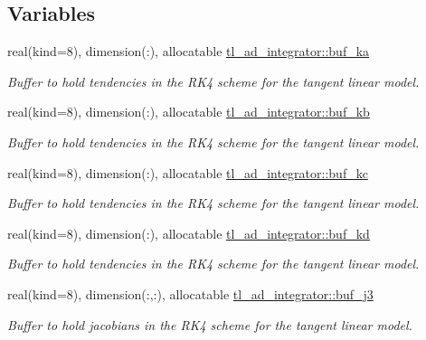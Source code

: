 \subsection*{Variables}
\begin{DoxyCompactItemize}
\item 
real(kind=8), dimension(\+:), allocatable \hyperlink{namespacetl__ad__integrator_a879cc86c1e268775237b6776a4ff7d32}{tl\+\_\+ad\+\_\+integrator\+::buf\+\_\+ka}
\begin{DoxyCompactList}\small\item\em Buffer to hold tendencies in the R\+K4 scheme for the tangent linear model. \end{DoxyCompactList}\item 
real(kind=8), dimension(\+:), allocatable \hyperlink{namespacetl__ad__integrator_abd6a1c209bc0120ea4e1e473e067a902}{tl\+\_\+ad\+\_\+integrator\+::buf\+\_\+kb}
\begin{DoxyCompactList}\small\item\em Buffer to hold tendencies in the R\+K4 scheme for the tangent linear model. \end{DoxyCompactList}\item 
real(kind=8), dimension(\+:), allocatable \hyperlink{namespacetl__ad__integrator_a1cf59efa7229b47e580202dfe4bd4fd6}{tl\+\_\+ad\+\_\+integrator\+::buf\+\_\+kc}
\begin{DoxyCompactList}\small\item\em Buffer to hold tendencies in the R\+K4 scheme for the tangent linear model. \end{DoxyCompactList}\item 
real(kind=8), dimension(\+:), allocatable \hyperlink{namespacetl__ad__integrator_a3b72ebc24a7e0eb44e22e6489ac81ed3}{tl\+\_\+ad\+\_\+integrator\+::buf\+\_\+kd}
\begin{DoxyCompactList}\small\item\em Buffer to hold tendencies in the R\+K4 scheme for the tangent linear model. \end{DoxyCompactList}\item 
real(kind=8), dimension(\+:,\+:), allocatable \hyperlink{namespacetl__ad__integrator_afb500987b643ce33b2a549ba213221fc}{tl\+\_\+ad\+\_\+integrator\+::buf\+\_\+j3}
\begin{DoxyCompactList}\small\item\em Buffer to hold jacobians in the R\+K4 scheme for the tangent linear model. \end{DoxyCompactList}\item 

\end{DoxyCompactItemize}
